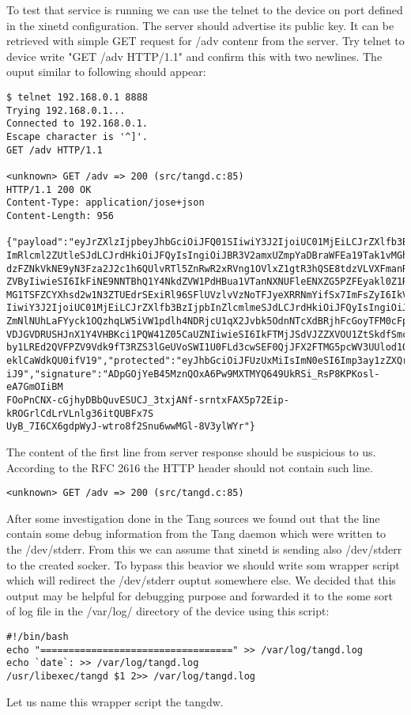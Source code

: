 To test that service is running we can use the telnet to the device on port defined in the xinetd configuration.
The server should advertise its public key.
It can be retrieved with simple GET request for /adv contenr from the server.
Try telnet to device write "GET /adv HTTP/1.1" and confirm this with two newlines.
The ouput similar to following should appear:
\begin{lstlisting}[columns=fixed,basicstyle=\ttfamily\footnotesize,tabsize=4,backgroundcolor=\color{yellow!10}]
$ telnet 192.168.0.1 8888
Trying 192.168.0.1...
Connected to 192.168.0.1.
Escape character is '^]'.
GET /adv HTTP/1.1

<unknown> GET /adv => 200 (src/tangd.c:85)
HTTP/1.1 200 OK
Content-Type: application/jose+json
Content-Length: 956

{"payload":"eyJrZXlzIjpbeyJhbGciOiJFQ01SIiwiY3J2IjoiUC01MjEiLCJrZXlfb3BzIjpb
ImRlcml2ZUtleSJdLCJrdHkiOiJFQyIsIngiOiJBR3V2amxUZmpYaDBraWFEa19Tak1vMGhYUm1R
dzFZNkVkNE9yN3Fza2J2c1h6QUlvRTl5ZnRwR2xRVng1OVlxZ1gtR3hQSE8tdzVLVXFmanRGQkVV
ZVByIiwieSI6IkFiNE9NNTBhQ1Y4NkdZVW1PdHBua1VTanNXNUFleENXZG5PZFEyakl0Z1RGNXNq
MG1TSFZCYXhsd2w1N3ZTUEdrSExiRl96SFlUVzlvVzNoTFJyeXRRNmYifSx7ImFsZyI6IkVTNTEy
IiwiY3J2IjoiUC01MjEiLCJrZXlfb3BzIjpbInZlcmlmeSJdLCJrdHkiOiJFQyIsIngiOiJBQVpS
ZmNlNUhLaFYyck1OQzhqLW5iVW1pdlh4NDRjcU1qX2Jvbk5OdnNTcXdBRjhFcGoyTFM0cFpfdUNR
VDJGVDRUSHJnX1Y4VHBKci1PQW41Z05CaUZNIiwieSI6IkFTMjJSdVJZZXVOU1ZtSkdfSmcwSW1n
by1LREd2QVFPZV9Vdk9fT3RZS3lGeUVoSWI1U0FLd3cwSEF0QjJFX2FTMG5pcWV3UUlod1QyanR5
eklCaWdkQU0ifV19","protected":"eyJhbGciOiJFUzUxMiIsImN0eSI6Imp3ay1zZXQranNvb
iJ9","signature":"ADpGOjYeB45MznQOxA6Pw9MXTMYQ649UkRSi_RsP8KPKosl-eA7GmOIiBM
FOoPnCNX-cGjhyDBbQuvESUCJ_3txjANf-srntxFAX5p72Eip-kROGrlCdLrVLnlg36itQUBFx7S
UyB_7I6CX6gdpWyJ-wtro8f2Snu6wwMGl-8V3ylWYr"}
\end{lstlisting}
The content of the first line from server response should be suspicious to us.
According to the RFC 2616 the HTTP header should not contain such line\cite{RFC2616}.
\begin{lstlisting}[columns=fixed,basicstyle=\ttfamily\footnotesize,tabsize=4,backgroundcolor=\color{yellow!10}]
<unknown> GET /adv => 200 (src/tangd.c:85)
\end{lstlisting}
After some investigation done in the Tang sources we found out that the line contain some debug information from the Tang daemon which were written to the /dev/stderr.
From this we can assume that xinetd is sending also /dev/stderr to the created socker.
To bypass this beavior we should write som wrapper script which will redirect the /dev/stderr ouptut somewhere else.
We decided that this output may be helpful for debugging purpose and forwarded it to the some sort of log file in the /var/log/ directory of the device using this script:
\begin{lstlisting}[columns=fixed,basicstyle=\ttfamily\footnotesize,tabsize=4,backgroundcolor=\color{yellow!10}]
#!/bin/bash
echo "==================================" >> /var/log/tangd.log
echo `date`: >> /var/log/tangd.log
/usr/libexec/tangd $1 2>> /var/log/tangd.log
\end{lstlisting}
Let us name this wrapper script the tangdw.


